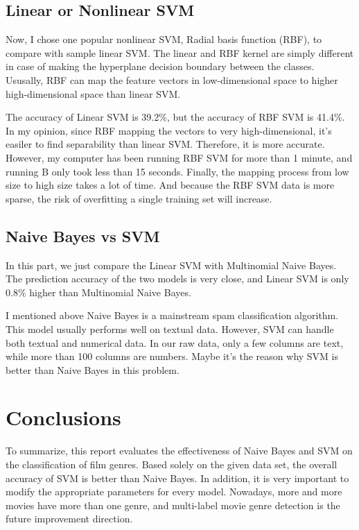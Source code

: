 \documentclass[11pt]{article}
\begin{document}
\subsection{Linear or Nonlinear SVM}

Now, I chose one popular nonlinear SVM, Radial basis function (RBF), to compare with sample linear SVM. The linear and RBF kernel are simply different in case of making the hyperplane decision boundary between the classes. Ususally, RBF can map the feature vectors in low-dimensional space to higher high-dimensional space than linear SVM.

The accuracy of Linear SVM is 39.2\%, but the accuracy of RBF SVM is 41.4\%. In my opinion, since RBF mapping the vectors to very high-dimensional, it's easiler to find separability than linear SVM. Therefore, it is more accurate. However, my computer has been running RBF SVM for more than 1 minute, and running B only took less than 15 seconds. Finally, the mapping process from low size to high size takes a lot of time. And because the RBF SVM data is more sparse, the risk of overfitting a single training set will increase.

\subsection{Naive Bayes vs SVM}

In this part, we just compare the Linear SVM with Multinomial Naive Bayes. The prediction accuracy of the two models is very close, and Linear SVM is only 0.8\% higher than Multinomial Naive Bayes.

I mentioned above Naive Bayes is a mainstream spam classification algorithm. This model usually performs well on textual data. However, SVM can handle both textual and numerical data. In our raw data, only a few columns are text, while more than 100 columns are numbers. Maybe it's the reason why SVM is better than Naive Bayes in this problem.

\section{Conclusions}

To summarize, this report evaluates the effectiveness of Naive Bayes and SVM on the classification of film genres. Based solely on the given data set, the overall accuracy of SVM is better than Naive Bayes. In addition, it is very important to modify the appropriate parameters for every model. Nowadays, more and more movies have more than one genre, and multi-label movie genre detection is the future improvement direction.




\end{document}
